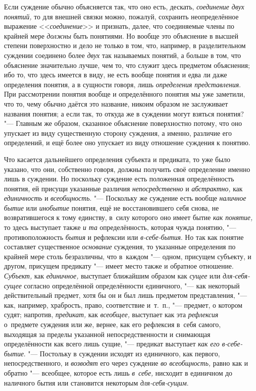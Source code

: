 Если суждение обычно объясняется так, что оно есть, дескать,
{\em соединение двух понятий,} то для внешней связки можно, пожалуй, сохранить
неопределённое выражение <<{\em соединение}>> и признать, далее, что
соединяемые члены по крайней мере {\em должны} быть понятиями. Но вообще это
объяснение в высшей степени поверхностно и дело не только в том, что, например,
в разделительном суждении соединено более {\em двух} так называемых
понятий, а больше в том, что объяснение значительно лучше, чем то, что
служит здесь предметом объяснения; ибо то, что здесь имеется в виду, не
есть вообще понятия и едва ли даже определения понятия, а в сущности говоря,
лишь {\em определения представления}. При рассмотрении понятия вообще и
определённого понятия мы уже заметили, что то, чему обычно даётся это
название, никоим образом не заслуживает названия понятия; а если так, то
откуда же в суждении могут взяться понятия? "--- Главным же
образом, сказанное объяснение поверхностно потому, что оно упускает из виду
существенную сторону суждения, а именно, различие его определений, и ещё
более оно упускает из виду отношение суждения к понятию.

Что касается дальнейшего определения субъекта и предиката, то
уже было указано, что они, собственно говоря, должны получить своё
определение именно лишь в суждении. Но поскольку суждение есть положенная
определённость понятия, ей присущи указанные различия
{\em непосредственно} и {\em абстрактно,} как {\em единичность}
и {\em всеобщность}. "--- Поскольку же суждение есть вообще
{\em наличное бытие} или {\em инобытие} понятия, ещё не восстановившего себя
снова, не возвратившегося к тому единству, в~силу которого оно имеет бытие
{\em как понятие,} то здесь выступает также {\em и та} определённость, которая
чужда понятию, "--- противоположность {\em бытия} и рефлексии или
{\em в-себе-бытия}. Но так как понятие составляет существенное {\em основание}
суждения, то указанные определения по крайней мере столь безразличны, что
в~каждом "--- одном, присущем субъекту, и другом, присущем предикату "---
имеет место также и обратное отношение. {\em Субъект,} как {\em единичное,}
выступает ближайшим образом как {\em сущее} или {\em для-себя-сущее}
согласно определённой определённости единичного, "---
как некоторый действительный предмет, хотя бы он и был лишь
предметом представления, "--- как, например, храбрость, право,
соответствие и~т.~п., "--- предмет, о котором судят; напротив,
{\em предикат,} как {\em всеобщее,} выступает как эта {\em рефлексия}
о~предмете суждения или же, вернее, как его рефлексия в~себя самого,
выходящая за пределы указанной непосредственности и снимающая определённости
как всего лишь сущие, "--- предикат выступает {\em как его в-себе-бытие}. "---
Постольку в суждении исходят из единичного, как первого, непосредственного, и
{\em возводят} его через суждение {\em во всеобщность,} равно как и обратно
"--- всеобщее, которое есть лишь {\em в~себе,} нисходит в единичном до
наличного бытия или становится некоторым {\em для-себя-сущим}.

